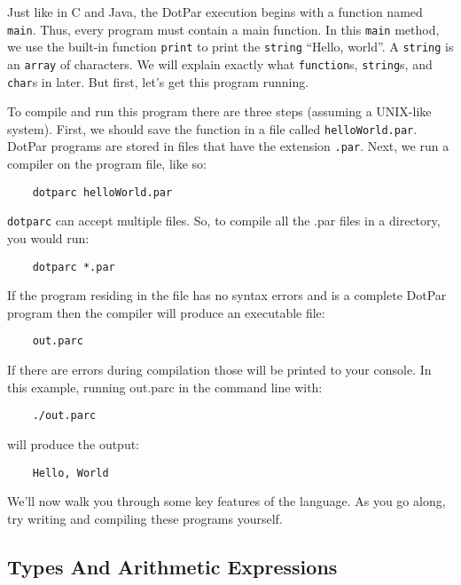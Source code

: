 \documentclass{article}
\begin{document}
Just like in C and Java, the DotPar execution begins with a function named \verb!main!. Thus, every program must contain a main function. In this \verb!main! method, we use the built-in function \verb!print! to print the \verb!string! ``Hello, world''. A \verb!string! is an \verb!array! of characters. We will explain exactly what \verb!function!s, \verb!string!s, and \verb!char!s in later. But first, let's get this program running.

To compile and run this program there are three steps (assuming a UNIX-like system). First, we should save the function in a file called \verb!helloWorld.par!. DotPar programs are stored in files that have the extension \verb!.par!. Next, we run a compiler on the program file, like so:

\begin{verbatim}
    dotparc helloWorld.par
\end{verbatim}

\verb!dotparc! can accept multiple files. So, to compile all the .par files in a directory, you would run: 

\begin{verbatim}
    dotparc *.par
\end{verbatim}

If the program residing in the file has no syntax errors and is a complete DotPar program then the compiler will produce an executable file:

\begin{verbatim}
    out.parc
\end{verbatim}

If there are errors during compilation those will be printed to your console. In this example, running out.parc in the command line with:

\begin{verbatim}
    ./out.parc
\end{verbatim}

will produce the output:

\begin{verbatim}
    Hello, World
\end{verbatim}

We'll now walk you through some key features of the language. As you go along, try writing and compiling these programs yourself.

\subsection{Types And Arithmetic Expressions}
\end{document}
